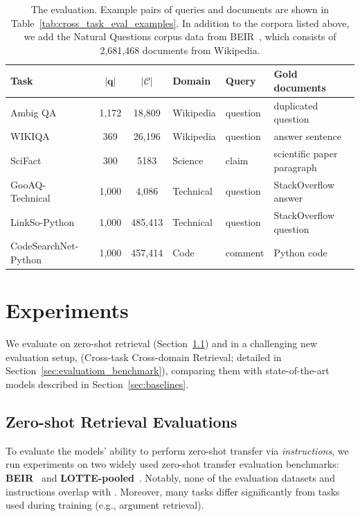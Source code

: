 \begin{table}[ht!]
\center
\small
\begin{tabular}{l  c  c  l  l l}
\toprule 
\textbf{Task}  & $|\boldsymbol{q}|$ &  $|\mathcal{C}|$ & \textbf{Domain} & \textbf{Query} & \textbf{Gold documents} \\  
\midrule
Ambig QA~\cite{min-etal-2020-ambigqa} & 1,172 & 18,809 & Wikipedia & question & duplicated question  \\
WIKIQA~\cite{yang-etal-2015-wikiqa} & 369 & 26,196 & Wikipedia & question & answer sentence \\
\midrule
SciFact~\cite{wadden-etal-2020-fact} & 300 & 5183 & Science & claim & scientific paper paragraph \\ 
\midrule
GooAQ-Technical~\cite{khashabi-etal-2021-gooaq-open} & 1,000 & 4,086 & Technical & question & StackOverflow answer \\
LinkSo-Python~\cite{linkso} & 1,000 & 485,413 &  Technical & question & StackOverflow question \\
CodeSearchNet-Python~\cite{husain2019codesearchnet} & 1,000 & 457,414 & Code & comment & Python code \\
\bottomrule
\end{tabular}
\caption{The \task evaluation. Example pairs of queries and documents are shown in Table~\ref{tab:cross_task_eval_examples}. In addition to the corpora listed above, we add the Natural Questions corpus data from BEIR~\cite{thakur2021beir}, which consists of 2,681,468 documents from Wikipedia. 
}
\label{tab:cross_task_eval}
\end{table}

\section{Experiments}
{
We evaluate
\model on zero-shot retrieval (Section~\ref{sec:beir_lotte}) and in a challenging new evaluation setup, \task (Cross-task Cross-domain Retrieval; detailed in Section~\ref{sec:evaluatiom_benchmark}), comparing them with state-of-the-art models described in Section~\ref{sec:baselines}. 
}


\subsection{Zero-shot Retrieval Evaluations}
\label{sec:beir_lotte}
To evaluate the models' ability to perform zero-shot transfer via {\it instructions}, we run experiments on two widely used zero-shot transfer evaluation benchmarks: {\bf BEIR}~\cite{thakur2021beir} and {\bf LOTTE-pooled}~\cite{santhanam-etal-2022-colbertv2}.
{
Notably, none of the evaluation datasets and instructions overlap with \rib. 
Moreover, many tasks differ significantly from tasks used during training (e.g., argument retrieval)}.

